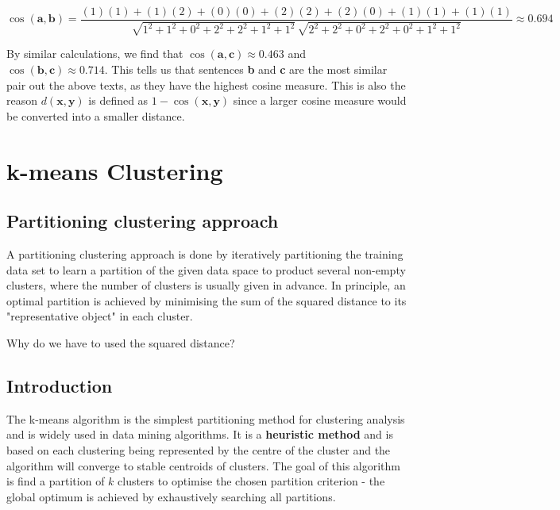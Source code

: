 \documentclass[11pt,fleqn]{book} %
\begin{document}
\begin{equation*}
	\cos(\mathbf{a}, \mathbf{b}) = \frac{(1)(1) + (1)(2) + (0)(0) + (2)(2) + (2)(0) + (1)(1) + (1)(1)}{\sqrt{1^2 + 1^2 + 0^2 + 2^2 + 2^2 + 1^2 + 1^2} \, \sqrt{2^2 + 2^2 + 0^2 + 2^2 + 0^2 + 1^2 + 1^2}} \approx 0.694
\end{equation*}

\noindent
By similar calculations, we find that $\cos(\mathbf{a}, \mathbf{c}) \approx 0.463$ and $\cos(\mathbf{b}, \mathbf{c}) \approx 0.714$. This tells us that sentences \textbf{b} and \textbf{c} are the most similar pair out the above texts, as they have the highest cosine measure. This is also the reason $d(\mathbf{x}, \mathbf{y})$ is defined as $1 - \cos(\mathbf{x}, \mathbf{y})$ since a larger cosine measure would be converted into a smaller distance.


\chapter{k-means Clustering}

\section{Partitioning clustering approach}
A partitioning clustering approach is done by iteratively partitioning the training data set to learn a partition of the given data space to product several non-empty clusters, where the number of clusters is usually given in advance. In principle, an optimal partition is achieved by minimising the sum of the squared distance to its "representative object" in each cluster.

\begin{exercise}
Why do we have to used the squared distance?
\end{exercise}

\section{Introduction}
The k-means algorithm is the simplest partitioning method for clustering analysis and is widely used in data mining algorithms. It is a \textbf{heuristic method} and is based on each clustering being represented by the centre of the cluster and the algorithm will converge to stable centroids of clusters. The goal of this algorithm is find a partition of $k$ clusters to optimise the chosen partition criterion - the global optimum is achieved by exhaustively searching all partitions.
\end{document}
